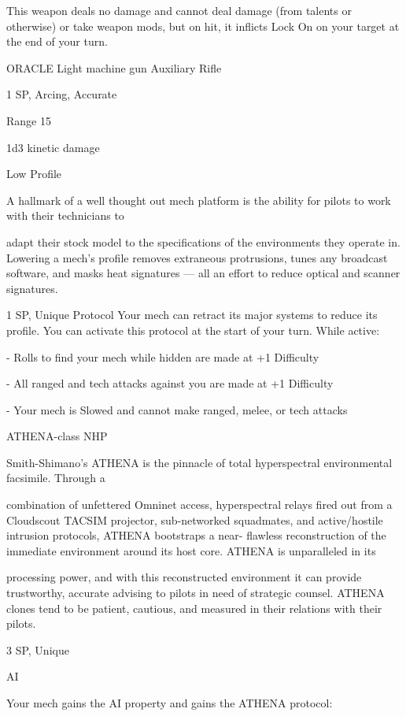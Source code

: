 This weapon deals no damage and cannot deal damage (from talents or otherwise) or take
weapon mods, but on hit, it inflicts Lock On on your target at the end of your turn.


ORACLE Light machine gun
Auxiliary Rifle

1 SP, Arcing, Accurate

Range 15

1d3 kinetic damage


Low Profile

A hallmark of a well thought out mech platform is the ability for pilots to work with their technicians to

adapt their stock model to the specifications of the environments they operate in. Lowering a mech’s profile
removes extraneous protrusions, tunes any broadcast software, and masks heat signatures — all an effort
to reduce optical and scanner signatures.

1 SP, Unique
Protocol
Your mech can retract its major systems to reduce its profile. You can activate this protocol at
the start of your turn. While active:

     -   Rolls to find your mech while hidden are made at +1 Difficulty

     -   All ranged and tech attacks against you are made at +1 Difficulty

     -   Your mech is Slowed and cannot make ranged, melee, or tech attacks


ATHENA-class NHP

Smith-Shimano’s ATHENA is the pinnacle of total hyperspectral environmental facsimile. Through a

combination of unfettered Omninet access, hyperspectral relays fired out from a Cloudscout TACSIM
projector, sub-networked squadmates, and active/hostile intrusion protocols, ATHENA bootstraps a near-
flawless reconstruction of the immediate environment around its host core. ATHENA is unparalleled in its

processing power, and with this reconstructed environment it can provide trustworthy, accurate advising to
pilots in need of strategic counsel.
ATHENA clones tend to be patient, cautious, and measured in their relations with their pilots.





3 SP, Unique

AI

Your mech gains the AI property and gains the ATHENA protocol:


